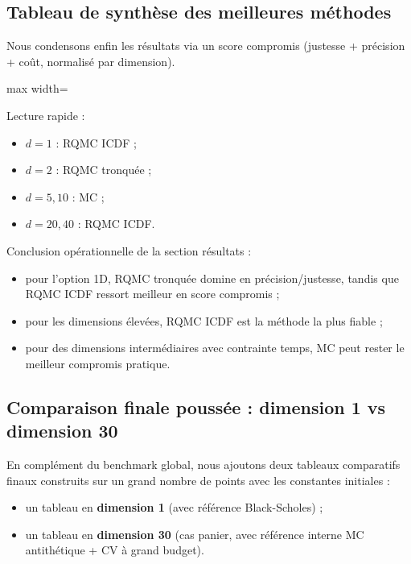 ﻿\documentclass[11pt,a4paper]{article}
\begin{document}
\subsection{Tableau de synthèse des meilleures méthodes}

Nous condensons enfin les résultats via un score compromis (justesse + précision + coût, normalisé par dimension).

\begin{table}[h!]
    \centering
    \caption{Meilleure méthode par dimension (score compromis).}
    \label{tab:results_refait_best}
    \begin{adjustbox}{max width=\textwidth}
    
    \end{adjustbox}
\end{table}

Lecture rapide :
\begin{itemize}
    \item $d=1$ : RQMC ICDF ;
    \item $d=2$ : RQMC tronquée ;
    \item $d=5,10$ : MC ;
    \item $d=20,40$ : RQMC ICDF.
\end{itemize}

Conclusion opérationnelle de la section résultats :
\begin{itemize}
    \item pour l'option 1D, RQMC tronquée domine en précision/justesse, tandis que RQMC ICDF ressort meilleur en score compromis ;
    \item pour les dimensions élevées, RQMC ICDF est la méthode la plus fiable ;
    \item pour des dimensions intermédiaires avec contrainte temps, MC peut rester le meilleur compromis pratique.
\end{itemize}

\subsection{Comparaison finale poussée : dimension 1 vs dimension 30}

En complément du benchmark global, nous ajoutons deux tableaux comparatifs finaux construits sur un grand nombre de points avec les constantes initiales :
\begin{itemize}
    \item un tableau en \textbf{dimension 1} (avec référence Black-Scholes) ;
    \item un tableau en \textbf{dimension 30} (cas panier, avec référence interne MC antithétique + CV à grand budget).
\end{itemize}
\end{document}
